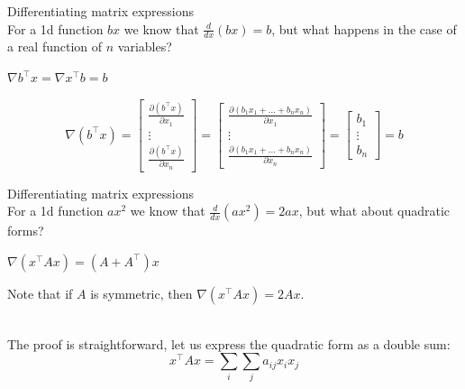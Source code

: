 \documentclass[UKenglish,aspectratio=169]{beamer}
\begin{document}
\begin{frame}{Differentiating matrix expressions}
~\\
For a 1d function $bx$ we know that $\frac{d}{dx}(bx) = b$, but what happens in the case of a real function of $n$ variables?
\begin{theorem}
$\nabla b^\top x = \nabla x^\top b = b$
\end{theorem}
\pause
$$\nabla(b^\top x) = \begin{bmatrix}\frac{\partial (b^\top x)}{\partial x_1} \\ \vdots \\ \frac{\partial (b^\top x)}{\partial x_n} \end{bmatrix} = \begin{bmatrix}\frac{\partial (b_1 x_1 + \dots + b_n x_n)}{\partial x_1} \\ \vdots \\ \frac{\partial (b_1 x_1 + \dots + b_n x_n)}{\partial x_n} \end{bmatrix} = \begin{bmatrix}b_1 \\ \vdots \\ b_n \end{bmatrix} = b$$
\end{frame}

\begin{frame}{Differentiating matrix expressions}
~\\
For a 1d function $ax^2$ we know that $\frac{d}{dx}(ax^2) = 2ax$, but what about quadratic forms?
\begin{theorem}
$\nabla (x^\top A x) = (A+A^\top)x$
\end{theorem}
Note that if $A$ is symmetric, then $\nabla (x^\top A x) = 2Ax$.

~\\

The proof is straightforward, let us express the quadratic form as a double sum:
$$x^\top A x = \sum\limits_i\sum\limits_j a_{ij} x_i x_j$$
\end{frame}
\end{document}
